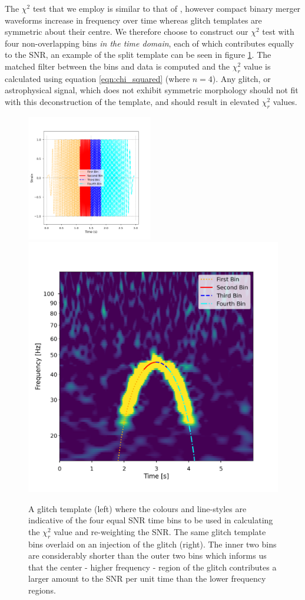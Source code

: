 The $\chi^2$ test that we employ is similar to that of \cite{Allen_2005}, however compact binary merger waveforms increase in frequency over time whereas \scl{} glitch templates are symmetric about their centre. We therefore choose to construct our $\chi^2$ test with four non-overlapping bins \emph{in the time domain}, each of which contributes equally to the SNR, an example of the split template can be seen in figure \ref{fig:split_temp_subplot}. The matched filter between the bins and data is computed and the $\chi_{r}^{2}$ value is calculated using equation \ref{eqn:chi_squared} (where $n=4$). Any glitch, or astrophysical signal, which does not exhibit symmetric morphology should not fit with this deconstruction of the template, and should result in elevated $\chi_{r}^{2}$ values.

\begin{figure}
  \centering
  \begin{minipage}[t]{1.0\linewidth}
  \includegraphics[width=0.49\textwidth]{images/archenemy/Section3/3.4/split_bins.pdf}
  \hspace{0.01\linewidth}
  \includegraphics[width=0.49\linewidth]{images/archenemy/Section3/3.4/split_bins_qscan.pdf}
  \end{minipage}
  \caption{A \scl{} glitch template (left) where the colours and line-styles are indicative of the four equal SNR time bins to be used in calculating the $\chi_{r}^{2}$ value and re-weighting the SNR. The same \scl{} glitch template bins overlaid on an injection of the \scl{} glitch (right). The inner two bins are considerably shorter than the outer two bins which informs us that the center - higher frequency - region of the \scl{} glitch contributes a larger amount to the SNR per unit time than the lower frequency regions.}
  \label{fig:split_temp_subplot}
\end{figure}

